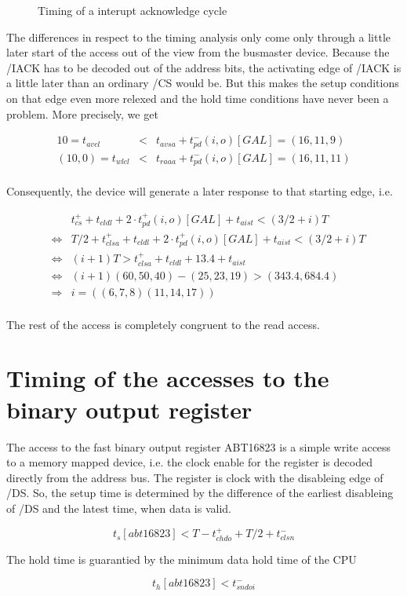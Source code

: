 \documentclass[12pt]{article}
\newcommand{\myfig}[4]{%
  \begin{figure}[htbp] \begin{center}%
  \makebox{\epsfysize=#2 \epsfbox{#1}} \caption{\label{#3} #4}%
  \end{center} \end{figure}}
\newcommand{\beqn}{\begin{eqnarray*}}
\newcommand{\eeqn}{\end{eqnarray*}}
\begin{document}
\myfig{ir-dev-tim.eps}{100mm}{ir-dev-tim}%
      {Timing of a interupt acknowledge cycle}

The differences in respect to the timing analysis only come only
through a little later start of the access out of the view from the
busmaster device. Because the /IACK has to
be decoded out of the address bits, the activating edge of /IACK is a
little later than an ordinary /CS would be. But this makes the setup
conditions on that edge even more relexed and the hold time conditions
have never been a problem. More precisely, we get

\beqn
10 = t_{avcl} &<& t_{avsa} + t_{pd}^-(i,o)[GAL] = (16,11,9)\\
(10,0) = t_{wlcl} &<& t_{raaa} + t_{pd}^-(i,o)[GAL] = (16,11,11)\\
\eeqn

Consequently, the device will generate a later response to that
starting edge, i.e.

\beqn
& & t_{cs}^+ + t_{cldl} + 2 \cdot t_{pd}^+(i,o)[GAL] +
t_{aist} < (3/2 + i) T\\
&\Leftrightarrow& T/2 + t_{clsa}^+ + t_{cldl} + 2 \cdot t_{pd}^+(i,o)[GAL] +
t_{aist} < (3/2 + i) T\\
&\Leftrightarrow& (i+1) T > t_{clsa}^+ + t_{cldl} +  13.4 + t_{aist}\\
&\Leftrightarrow& (i+1)(60,50,40) - (25,23,19) > (343.4,684.4)\\
&\Rightarrow& i = ((6,7,8)(11,14,17))\\
\eeqn

The rest of the access is completely congruent to the read access.


\section{Timing of the accesses to the binary output register}

The access to the fast binary output register ABT16823 is a simple
write access to a memory mapped device, i.e. the clock enable for the
register is decoded directly from the address bus. The register is
clock with the disableing edge of /DS. So, the setup time is
determined by the difference of the earliest disableing of /DS and the
latest time, when data is valid.

\[ t_s[abt16823] < T - t_{chdo}^+ + T/2 + t_{clsn}^- \]

The hold time is guarantied by the minimum data hold time of the CPU

\[ t_h[abt16823] < t_{sndoi}^- \]
\end{document}
